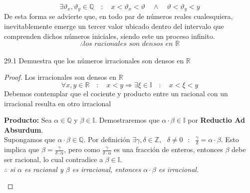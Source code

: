 \documentclass{article}
\begin{document}
\[ \exists \vartheta_x,\vartheta_y \in \mathbb{Q} \quad : \quad x < \vartheta_x < \vartheta \quad \land \quad \vartheta < \vartheta_y < y \]
De esta forma se advierte que, en todo par de números reales cualesquiera, inevitablemente emerge un tercer valor ubicado dentro del intervalo que comprenden dichos números iniciales, siendo este un proceso infinito.
\[ \therefore \textit{los racionales son densos en  } \mathbb{R} \]\\
29.1 Demuestra que los números irracionales son densos en \(\mathbb{R}\)
\begin{proof}
    Los irracionales son densos en \( \mathbb{R} \)
    \[\forall x,y \in \mathbb{R} \quad : \quad x < y \Rightarrow \exists \xi \in \mathbb{I} \quad : \quad x < \xi < y \]
    Debemos contemplar que el cociente y producto entre un racional con un irracional resulta en otro irracional
    \begin{mdframed}
\textbf{Producto:} Sea $\alpha \in \mathbb{Q}$ y $\beta \in \mathbb{I}$. Demostraremos que $\alpha \cdot \beta \in \mathbb{I}$ por \textbf{Reductio Ad Absurdum}. \\
Supongamos que $\alpha \cdot \beta \in \mathbb{Q}$. Por definición $\exists \gamma,\delta \in \mathbb{Z},\textit{ } \delta \neq 0 \textit{  } : \textit{  } \frac{\gamma}{\delta} = \alpha \cdot \beta$. Esto implica que $\beta = \frac{\gamma}{\delta \cdot \alpha}$, pero como $\frac{\gamma}{\delta \cdot \alpha}$ es una fracción de enteros, entonces $\beta$ debe ser racional, lo cual contradice a $\beta \in \mathbb{I}$.\\
$\therefore$ \textit{si $\alpha$ es racional y $\beta$ es irracional, entonces $\alpha \cdot \beta$ es irracional.}


\end{mdframed}
\end{proof}
\end{document}
